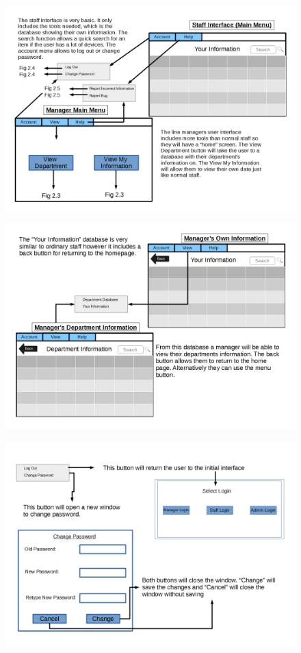 \begin{figure}[H]
\includegraphics[width=\textwidth,angle=90]{GUI_Design2.jpg}
\caption{}
\end{figure}

\begin{figure}[H]
\includegraphics[width=\textwidth,angle=90]{GUI_Design3.jpg}
\caption{}
\end{figure}

\begin{figure}[H]
\includegraphics[width=\textwidth,angle=90]{GUI_Design4.jpg}
\caption{}
\end{figure}


